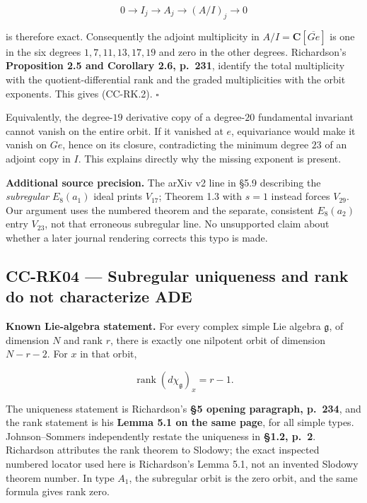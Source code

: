 \documentclass[11pt,a4paper]{article}
\theoremstyle{definition}\newtheorem{definition}[theorem]{Definition}
\theoremstyle{remark}\newtheorem{remark}[theorem]{Remark}
\begin{document}
\[
 0\longrightarrow I_j\longrightarrow A_j
     \longrightarrow (A/I)_j\longrightarrow0
\]

is therefore exact. Consequently the adjoint multiplicity in \(A/I=\mathbf C[\overline{G e}]\) is one in the six degrees \(1,7,11,13,17,19\) and zero in the other degrees. Richardson's \textbf{Proposition 2.5 and Corollary 2.6, p.~231}, identify the total multiplicity with the quotient-differential rank and the graded multiplicities with the orbit exponents. This gives (CC-RK.2). \(\square\)

Equivalently, the degree-\(19\) derivative copy of a degree-\(20\) fundamental invariant cannot vanish on the entire orbit. If it vanished at \(e\), equivariance would make it vanish on \(Ge\), hence on its closure, contradicting the minimum degree \(23\) of an adjoint copy in \(I\). This explains directly why the missing exponent is present.

\textbf{Additional source precision.} The arXiv v2 line in §5.9 describing the \emph{subregular} \(E_8(a_1)\) ideal prints \(V_{17}\); Theorem 1.3 with \(s=1\) instead forces \(V_{29}\). Our argument uses the numbered theorem and the separate, consistent \(E_8(a_2)\) entry \(V_{23}\), not that erroneous subregular line. No unsupported claim about whether a later journal rendering corrects this typo is made.

\subsection{CC-RK04 --- Subregular uniqueness and rank do not characterize ADE}\label{cc-rk04-subregular-uniqueness-and-rank-do-not-characterize-ade}

\textbf{Known Lie-algebra statement.} For every complex simple Lie algebra \(\mathfrak g\), of dimension \(N\) and rank \(r\), there is exactly one nilpotent orbit of dimension \(N-r-2\). For \(x\) in that orbit,

\[
 \operatorname{rank}(d\chi_{\mathfrak g})_x=r-1.
 \tag{CC-RK.3}
\]

The uniqueness statement is Richardson's \textbf{§5 opening paragraph, p.~234}, and the rank statement is his \textbf{Lemma 5.1 on the same page}, for all simple types. Johnson--Sommers independently restate the uniqueness in \textbf{§1.2, p.~2}. Richardson attributes the rank theorem to Slodowy; the exact inspected numbered locator used here is Richardson's Lemma 5.1, not an invented Slodowy theorem number. In type \(A_1\), the subregular orbit is the zero orbit, and the same formula gives rank zero.
\end{document}
